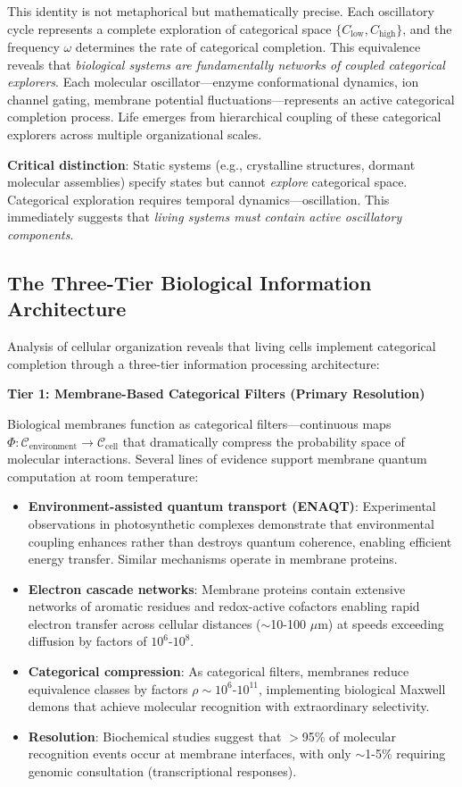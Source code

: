 \documentclass[11pt]{article}
\begin{document}
This identity is not metaphorical but mathematically precise. Each oscillatory cycle represents a complete exploration of categorical space $\{C_{\text{low}}, C_{\text{high}}\}$, and the frequency $\omega$ determines the rate of categorical completion. This equivalence reveals that \textit{biological systems are fundamentally networks of coupled categorical explorers}. Each molecular oscillator—enzyme conformational dynamics, ion channel gating, membrane potential fluctuations—represents an active categorical completion process. Life emerges from hierarchical coupling of these categorical explorers across multiple organizational scales.

\textbf{Critical distinction}: Static systems (e.g., crystalline structures, dormant molecular assemblies) specify states but cannot \textit{explore} categorical space. Categorical exploration requires temporal dynamics—oscillation. This immediately suggests that \textit{living systems must contain active oscillatory components}.

\subsection{The Three-Tier Biological Information Architecture}

Analysis of cellular organization reveals that living cells implement categorical completion through a three-tier information processing architecture:

\textbf{Tier 1: Membrane-Based Categorical Filters (Primary Resolution)}

Biological membranes function as categorical filters—continuous maps $\Phi: \mathcal{C}_{\text{environment}} \to \mathcal{C}_{\text{cell}}$ that dramatically compress the probability space of molecular interactions. Several lines of evidence support membrane quantum computation at room temperature:

\begin{itemize}
\item \textbf{Environment-assisted quantum transport (ENAQT)}: Experimental observations in photosynthetic complexes \citep{Engel2007, Collini2010} demonstrate that environmental coupling enhances rather than destroys quantum coherence, enabling efficient energy transfer. Similar mechanisms operate in membrane proteins.
\item \textbf{Electron cascade networks}: Membrane proteins contain extensive networks of aromatic residues and redox-active cofactors enabling rapid electron transfer across cellular distances ($\sim$10-100 $\mu$m) at speeds exceeding diffusion by factors of $10^6$-$10^8$.
\item \textbf{Categorical compression}: As categorical filters, membranes reduce equivalence classes by factors $\rho \sim 10^6$-$10^{11}$, implementing biological Maxwell demons that achieve molecular recognition with extraordinary selectivity.
\item \textbf{Resolution}: Biochemical studies suggest that $>$95\% of molecular recognition events occur at membrane interfaces, with only $\sim$1-5\% requiring genomic consultation (transcriptional responses).
\end{itemize}
\end{document}
